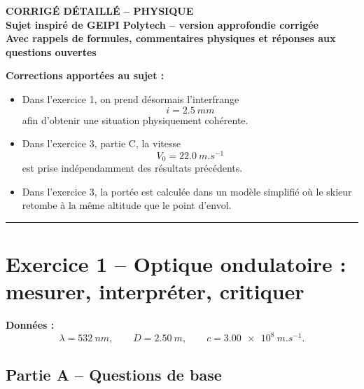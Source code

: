 \documentclass[11pt,a4paper]{article}
\begin{document}
\begin{center}
    {\Large \textbf{CORRIGÉ DÉTAILLÉ -- PHYSIQUE}}\\[0.3em]
    {\large \textbf{Sujet inspiré de GEIPI Polytech -- version approfondie corrigée}}\\[0.4em]
    {\large \textbf{Avec rappels de formules, commentaires physiques et réponses aux questions ouvertes}}
\end{center}

\vspace{0.5em}

\noindent\textbf{Corrections apportées au sujet :}
\begin{itemize}[leftmargin=1.8em]
    \item Dans l'exercice 1, on prend désormais l'interfrange
    \[
    i=\SI{2,5}{mm}
    \]
    afin d'obtenir une situation physiquement cohérente.
    \item Dans l'exercice 3, partie C, la vitesse
    \[
    V_0=\SI{22,0}{m.s^{-1}}
    \]
    est prise indépendamment des résultats précédents.
    \item Dans l'exercice 3, la portée est calculée dans un modèle simplifié où le skieur retombe à la même altitude que le point d'envol.
\end{itemize}

\vspace{0.5em}
\hrule
\vspace{0.6em}

\section*{Exercice 1 -- Optique ondulatoire : mesurer, interpréter, critiquer}

\noindent\textbf{Données :}
\[
\lambda=\SI{532}{nm},\qquad
D=\SI{2,50}{m},\qquad
c=\SI{3,00e8}{m.s^{-1}}.
\]

\vspace{0.3em}

\subsection*{Partie A -- Questions de base}
\end{document}

